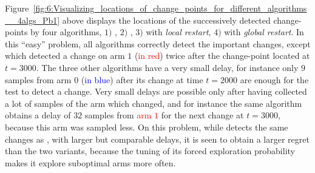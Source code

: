 Figure~\ref{fig:6:Visualizing_locations_of_change_points_for_different_algorithms__4algs_Pb1} above displays the locations of the successively detected change-points by four algorithms,
$1)$ \MklUCB,
$2)$ \CUSUMklUCB,
$3)$ \GLRklUCB{} with \emph{local restart},
$4)$ \GLRklUCB{} with \emph{global restart}.
In this ``easy'' problem, all algorithms correctly detect the important changes, except \CUSUM{} which detected a change on arm $1$ (\textcolor{red}{in red}) twice after the change-point located at $t=3000$.
The three other algorithms have a very small delay, for instance only $9$ samples from arm $0$ (\textcolor{blue}{in blue}) after its change at time $t=2000$ are enough for the \GLR{} test to detect a change.
Very small delays are possible only after having collected a lot of samples of the arm which changed, and for instance the same algorithm obtains a delay of $32$ samples from \textcolor{red}{arm $1$} for the next change at $t=3000$, because this arm was sampled less.
On this problem, while \MklUCB{} detects the same changes as \GLRklUCB, with larger but comparable delays, it is seen to obtain a larger regret than the two \GLR{} variants, because the tuning of its forced exploration probability makes it explore suboptimal arms more often.



